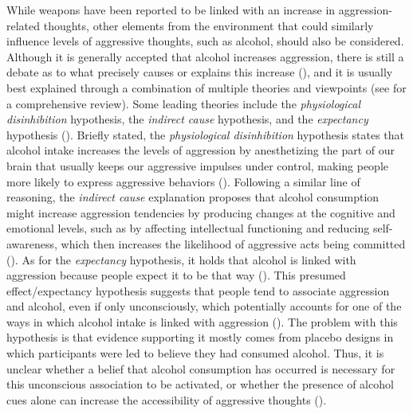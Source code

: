 \documentclass[serif, authorddate, twocolumn, empirical]{jote-article}
\begin{document}
While weapons have been reported to be linked with an increase in aggression-related thoughts, other elements from the environment that could similarly influence levels of aggressive thoughts, such as alcohol, should also be considered. Although it is generally accepted that alcohol increases aggression, there is still a debate as to what precisely causes or explains this increase (\cite{BartholowHeinz2006}), and it is usually best explained through a combination of multiple theories and viewpoints (see \textcite{HeinzBeckMeyerLindenbergSterzerHeinz2011} for a comprehensive review). Some leading theories include the \textit{physiological disinhibition} hypothesis, the \textit{indirect cause} hypothesis, and the \textit{expectancy }hypothesis (\cite{Bushman2002}). Briefly stated, the \textit{physiological disinhibition} hypothesis states that alcohol intake increases the levels of aggression by anesthetizing the part of our brain that usually keeps our aggressive impulses under control, making people more likely to express aggressive behaviors (\cite{Bushman2002}). Following a similar line of reasoning, the \textit{indirect cause} explanation proposes that alcohol consumption might increase aggression tendencies by producing changes at the cognitive and emotional levels, such as by affecting intellectual functioning and reducing self-awareness, which then increases the likelihood of aggressive acts being committed (\cite{Bushman2002}). As for the \textit{expectancy }hypothesis, it holds that alcohol is linked with aggression because people expect it to be that way (\cite{Bushman2002}). This presumed effect/expectancy hypothesis suggests that people tend to associate aggression and alcohol, even if only unconsciously, which potentially accounts for one of the ways in which alcohol intake is linked with aggression (\cite{BartholowHeinz2006}). The problem with this hypothesis is that evidence supporting it mostly comes from placebo designs in which participants were led to believe they had consumed alcohol. Thus, it is unclear whether a belief that alcohol consumption has occurred is necessary for this unconscious association to be activated, or whether the presence of alcohol cues alone can increase the accessibility of aggressive thoughts (\cite{BartholowHeinz2006}). 
\end{document}
